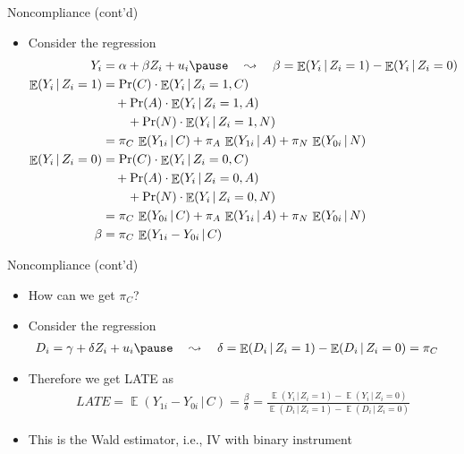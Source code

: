 \documentclass[aspectratio=169,compress,handout,t,xcolor=table]{beamer}
\DeclareMathOperator{\E}{\mathbb{E}}                       %
\begin{document}
\begin{frame}{Noncompliance (cont'd)}
  \begin{itemize}
    \item Consider the regression
    \begin{align*}
      Y_i &= \alpha + \beta Z_i + u_i \pause \quad \leadsto \quad \beta = \E(Y_i \,|\, Z_i=1) - \E(Y_i \,|\, Z_i=0) \\
      \E(Y_i \,|\, Z_i=1) &= \Pr(C) \cdot \E(Y_i \,|\, Z_i=1, C) \\ &\quad+ \Pr(A) \cdot \E(Y_i \,|\, Z_i=1, A) \\&\qquad + \Pr(N) \cdot \E(Y_i \,|\, Z_i=1, N) \\
      &= \pi_C \, \E(Y_{1i} \,|\, C) + \pi_A \, \E(Y_{1i} \,|\, A) + \pi_N \, \E(Y_{0i} \,|\, N) \\
      \E(Y_i \,|\, Z_i=0) &= \Pr(C) \cdot \E(Y_i \,|\, Z_i=0, C) \\ &\quad+ \Pr(A) \cdot \E(Y_i \,|\, Z_i=0, A) \\&\qquad + \Pr(N) \cdot \E(Y_i \,|\, Z_i=0, N) \\
      &= \pi_C \, \E(Y_{0i} \,|\, C) + \pi_A \, \E(Y_{1i} \,|\, A) + \pi_N \, \E(Y_{0i} \,|\, N) \\
      \beta &= \pi_C \, \E(Y_{1i} - Y_{0i} \,|\, C)
    \end{align*}
  \end{itemize}
\end{frame}

\begin{frame}{Noncompliance (cont'd)}
  \begin{itemize}
    \item How can we get \(\pi_C\)?
    \item Consider the regression
    \begin{align*}
      D_i &= \gamma + \delta Z_i + u_i \pause \quad \leadsto \quad \delta = \E(D_i \,|\, Z_i=1) - \E(D_i \,|\, Z_i=0) = \pi_C
    \end{align*}
    \item Therefore we get LATE as
    \begin{align*}
      LATE = \E(Y_{1i} - Y_{0i} \,|\, C) = \frac{\beta}{\delta} = \frac{\E(Y_i \,|\, Z_i=1) - \E(Y_i \,|\, Z_i=0)}{\E(D_i \,|\, Z_i=1) - \E(D_i \,|\, Z_i=0)}
    \end{align*}
    \item This is the Wald estimator, i.e., IV with binary instrument
  \end{itemize}
\end{frame}
\end{document}
